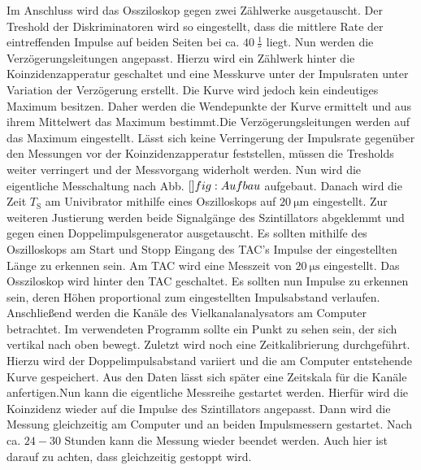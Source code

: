  Im Anschluss wird das Ossziloskop gegen zwei Zählwerke ausgetauscht. Der Treshold der Diskriminatoren wird so eingestellt, dass die mittlere Rate der eintreffenden Impulse auf beiden Seiten bei ca. $\SI{40}{\frac{1}{\second}}$ liegt. Nun werden die Verzögerungsleitungen angepasst. Hierzu wird ein Zählwerk hinter die Koinzidenzapperatur geschaltet und eine Messkurve unter der Impulsraten unter Variation der Verzögerung erstellt. Die Kurve wird jedoch kein eindeutiges Maximum besitzen. Daher werden die Wendepunkte der Kurve ermittelt und aus ihrem Mittelwert das Maximum bestimmt.Die Verzögerungsleitungen werden auf das Maximum eingestellt. Lässt sich keine Verringerung der Impulsrate gegenüber den Messungen vor der Koinzidenzapperatur feststellen, müssen die Tresholds weiter verringert und der Messvorgang widerholt werden. Nun wird die eigentliche Messchaltung nach Abb. $\ref{}fig:Aufbau$ aufgebaut. Danach wird die Zeit $T_\text{S}$ am Univibrator mithilfe eines Oszilloskops auf $\SI{20}{\micro\meter}$ eingestellt. Zur weiteren Justierung werden beide Signalgänge des Szintillators abgeklemmt und gegen einen Doppelimpulsgenerator ausgetauscht. Es sollten mithilfe des Oszilloskops am Start und Stopp Eingang des TAC's Impulse der eingestellten Länge zu erkennen sein. Am TAC wird eine Messzeit von $\SI{20}{\micro\second}$ eingestellt. Das Ossziloskop wird hinter den TAC geschaltet. Es sollten nun Impulse zu erkennen sein, deren Höhen proportional zum eingestellten Impulsabstand verlaufen. Anschließend werden die Kanäle des Vielkanalanalysators am Computer betrachtet. Im verwendeten Programm sollte  ein Punkt zu sehen sein, der sich vertikal nach oben bewegt. Zuletzt wird noch eine Zeitkalibrierung durchgeführt. Hierzu wird der Doppelimpulsabstand variiert und die am Computer entstehende Kurve gespeichert. Aus den Daten lässt sich später eine Zeitskala für die Kanäle anfertigen.Nun kann die eigentliche Messreihe gestartet werden. Hierfür wird die Koinzidenz wieder auf die Impulse des Szintillators angepasst. Dann wird die Messung gleichzeitig am Computer und an beiden Impulsmessern gestartet. Nach ca. $24-30$ Stunden kann die Messung wieder beendet werden. Auch hier ist darauf zu achten, dass gleichzeitig gestoppt wird.  
